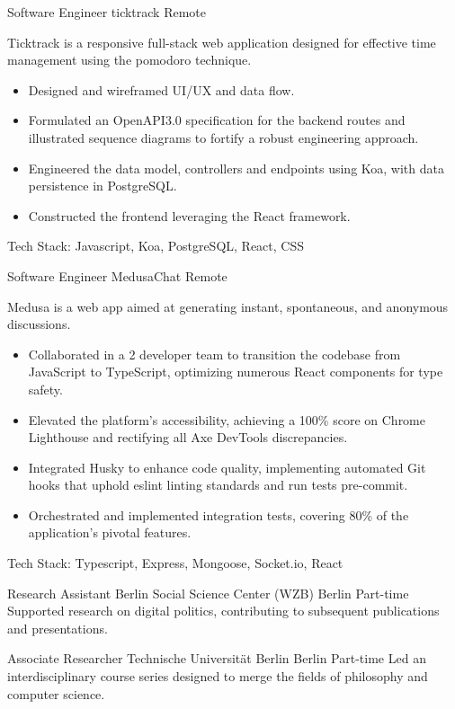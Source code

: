   {Software Engineer}
  {ticktrack}
  {Remote}
  {}
  {
    Ticktrack is a responsive full-stack web application designed for effective time management using the pomodoro technique.
    \begin{itemize}
    	\item Designed and wireframed UI/UX and data flow.
    	\item Formulated an OpenAPI3.0 specification for the backend routes and illustrated sequence diagrams to fortify a robust engineering approach.
    	\item Engineered the data model, controllers and endpoints using Koa, with data persistence in PostgreSQL.
    	\item Constructed the frontend leveraging the React framework.
    \end{itemize}
  Tech Stack: Javascript, Koa, PostgreSQL, React, CSS
  }
  {Software Engineer}
  {MedusaChat}
  {Remote}
  {}
  {
    Medusa is a web app aimed at generating instant, spontaneous, and anonymous discussions.
    \begin{itemize}
		\item Collaborated in a 2 developer team to transition the codebase from JavaScript to TypeScript, optimizing numerous React components for type safety.
		\item Elevated the platform's accessibility, achieving a 100\% score on Chrome Lighthouse and rectifying all Axe DevTools discrepancies.
		\item Integrated Husky to enhance code quality, implementing automated Git hooks that uphold eslint linting standards and run tests pre-commit.
		\item Orchestrated and implemented integration tests, covering 80\% of the application's pivotal features.
    \end{itemize}
Tech Stack: Typescript, Express, Mongoose, Socket.io, React
  }


  {Research Assistant}
  {Berlin Social Science Center (WZB)}
  {Berlin}
  {Part-time}
  {Supported research on digital politics, contributing to subsequent publications and presentations.}

  {Associate Researcher}
  {Technische Universität Berlin}
  {Berlin}
  {Part-time}
  {Led an interdisciplinary course series designed to merge the fields of philosophy and computer science.}

